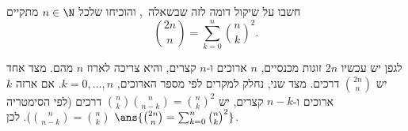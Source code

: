 חשבו על שיקול דומה לזה שבשאלה~, והוכיחו שלכל $n\in\N$ מתקיים
\[
\binom{2n}n=\sum_{k=0}^n\binom nk^2.
\]
\begin{solbox}
לגפן יש עכשיו $2n$ זוגות מכנסיים, $n$ ארוכים ו-$n$ קצרים, והיא צריכה לארוז $n$ מהם. מצד אחד יש $\binom{2n}n$ דרכים.
מצד שני, נחלק למקרים לפי מספר הארוכים, $k=0,\dots,n$. אם ארזה $k$ ארוכים ו-$n-k$ קצרים, יש $\binom nk\binom n{n-k}=\binom nk^2$ דרכים (לפי הסימטריה $\binom n{n-k}=\binom nk$). לכן $\ans{\binom{2n}n=\sum_{k=0}^n\binom nk^2}$.
\end{solbox}
